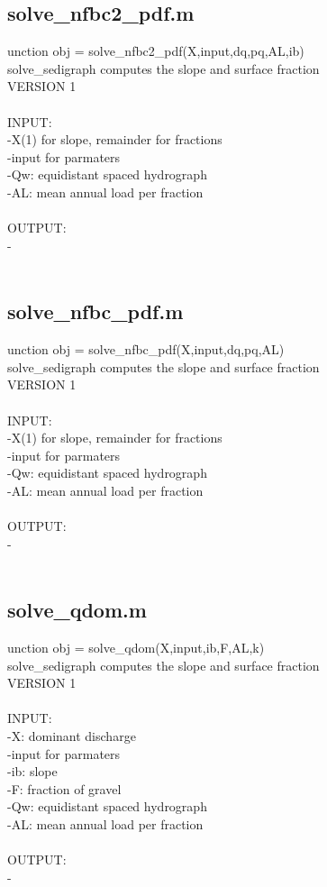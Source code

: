 \subsection{solve\_nfbc2\_pdf.m}
unction obj = solve\_nfbc2\_pdf(X,input,dq,pq,AL,ib) \\ 
solve\_sedigraph computes the slope and surface fraction  \\ 
 VERSION 1 \\ 
 \\ 
INPUT: \\ 
   -X(1) for slope, remainder for fractions \\ 
   -input for parmaters \\ 
   -Qw: equidistant spaced hydrograph \\ 
   -AL: mean annual load per fraction \\ 
 \\ 
OUTPUT: \\ 
   - \\ 
 \\ 
\subsection{solve\_nfbc\_pdf.m}
unction obj = solve\_nfbc\_pdf(X,input,dq,pq,AL) \\ 
solve\_sedigraph computes the slope and surface fraction  \\ 
 VERSION 1 \\ 
 \\ 
INPUT: \\ 
   -X(1) for slope, remainder for fractions \\ 
   -input for parmaters \\ 
   -Qw: equidistant spaced hydrograph \\ 
   -AL: mean annual load per fraction \\ 
 \\ 
OUTPUT: \\ 
   - \\ 
 \\ 
\subsection{solve\_qdom.m}
unction obj = solve\_qdom(X,input,ib,F,AL,k) \\ 
solve\_sedigraph computes the slope and surface fraction  \\ 
 VERSION 1 \\ 
 \\ 
INPUT: \\ 
   -X: dominant discharge \\ 
   -input for parmaters \\ 
   -ib: slope \\ 
   -F: fraction of gravel  \\ 
   -Qw: equidistant spaced hydrograph \\ 
   -AL: mean annual load per fraction \\ 
 \\ 
OUTPUT: \\ 
   - \\ 
 \\ 
